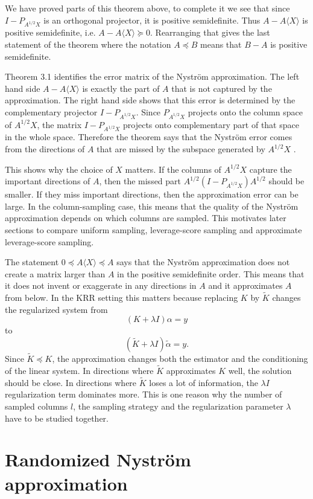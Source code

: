We have proved parts of this theorem above, to complete it we see that since $I-P_{A^{1/2}X}$ is an orthogonal projector, it is positive semidefinite. Thus $A-A\langle X\rangle$ is positive semidefinite, i.e. $A-A\langle X\rangle\succeq 0$. Rearranging that gives the last statement of the theorem where the notation $A\preceq B$ means that $B-A$ is positive semidefinite.

Theorem 3.1 identifies the error matrix of the Nystr\"om approximation. The left hand side $A-A\langle X\rangle$ is exactly the part of $A$ that is not captured by the approximation. The right hand side shows that this error is determined by the complementary projector $I-P_{A^{1/2}X}$. Since $P_{A^{1/2}X}$ projects onto the column space of $A^{1/2}X$, the matrix $I-P_{A^{1/2}X}$ projects onto complementary part of that space in the whole space. Therefore the theorem says that the Nystr\"om error comes from the directions of $A$ that are missed by the subspace generated by $A^{1/2}X$ \citep{martinsson2020randomized}.

This shows why the choice of $X$ matters. If the columns of $A^{1/2}X$ capture the important directions of $A$, then the missed part $A^{1/2}(I-P_{A^{1/2}X})A^{1/2}$
should be smaller. If they miss important directions, then the approximation error can be large. In the column-sampling case, this means that the quality of the Nystr\"om approximation depends on which columns are sampled. This motivates later sections to compare uniform sampling, leverage-score sampling and approximate leverage-score sampling.

The statement $0\preceq A\langle X\rangle\preceq A$ says that the Nystr\"om approximation does not create a matrix larger than $A$ in the positive semidefinite order. This means that it does not invent or exaggerate in any directions in $A$ and it approximates $A$ from below. In the KRR setting this matters because replacing $K$ by $\tilde K$ changes the regularized system from
\[
(K+\lambda I)\alpha=y
\]
to
\[
(\tilde K+\lambda I)\tilde\alpha=y.
\]
Since $\tilde K\preceq K$, the approximation changes both the estimator and the conditioning of the linear system. In directions where $\tilde K$ approximates $K$ well, the solution should be close. In directions where $\tilde K$ loses a lot of information, the $\lambda I$ regularization term dominates more. This is one reason why the number of sampled columns $l$, the sampling strategy and the regularization parameter $\lambda$ have to be studied together.

\section{Randomized Nystr\"om approximation}

